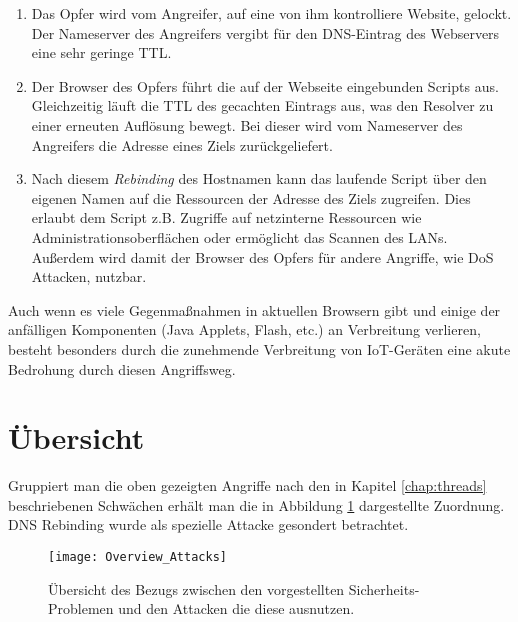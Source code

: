 \begin{enumerate}[topsep=0pt,itemsep=-1ex,partopsep=1ex,parsep=1ex]
    \item Das Opfer wird vom Angreifer, auf eine von ihm kontrolliere Website, gelockt. Der Nameserver des Angreifers vergibt für den DNS-Eintrag des Webservers eine sehr geringe TTL.
    \item Der Browser des Opfers führt die auf der Webseite eingebunden Scripts aus. Gleichzeitig läuft die TTL des gecachten Eintrags aus, was den Resolver zu einer erneuten Auflösung bewegt. Bei dieser wird vom Nameserver des Angreifers die Adresse eines Ziels zurückgeliefert.
    \item Nach diesem \textit{Rebinding} des Hostnamen kann das laufende Script über den eigenen Namen auf die Ressourcen der Adresse des Ziels zugreifen. Dies erlaubt dem Script z.B. Zugriffe auf netzinterne Ressourcen wie Administrationsoberflächen oder ermöglicht das Scannen des LANs. Außerdem wird damit der Browser des Opfers für andere Angriffe, wie \ac{DoS} Attacken, nutzbar.   
\end{enumerate}

Auch wenn es viele Gegenmaßnahmen in aktuellen Browsern gibt und einige der anfälligen Komponenten (Java Applets, Flash, etc.) an Verbreitung verlieren, besteht besonders durch die zunehmende Verbreitung von IoT-Geräten eine akute Bedrohung durch diesen Angriffsweg\cite{Dorsey2018}. 

\section{Übersicht}
Gruppiert man die oben gezeigten Angriffe nach den in Kapitel \ref{chap:threads} beschriebenen Schwächen erhält man die in Abbildung \ref{img:attacks-summary} dargestellte Zuordnung. DNS Rebinding wurde als spezielle Attacke gesondert betrachtet.

\begin{figure}[!hb]
    \centering
    \texttt{[image: Overview\_Attacks]}
    \caption{Übersicht des Bezugs zwischen den vorgestellten Sicherheits-Problemen und den Attacken die diese ausnutzen.}
    \label{img:attacks-summary}
\end{figure}

